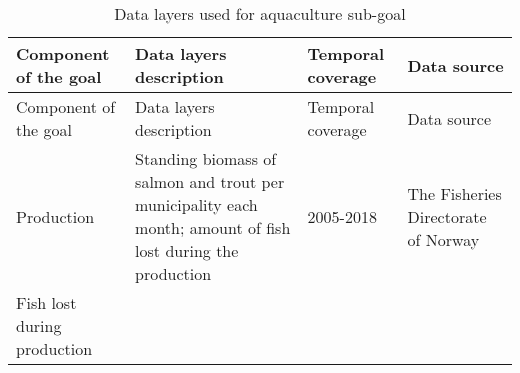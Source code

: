 \documentclass[
]{book}
\begin{document}
\begin{longtable}[]{@{}llll@{}}
\caption{\label{tab:simple-table} Data layers used for aquaculture sub-goal}\tabularnewline
\toprule
\begin{minipage}[b]{0.23\columnwidth}\raggedright
Component of the goal\strut
\end{minipage} & \begin{minipage}[b]{0.22\columnwidth}\raggedright
Data layers description\strut
\end{minipage} & \begin{minipage}[b]{0.25\columnwidth}\raggedright
Temporal coverage\strut
\end{minipage} & \begin{minipage}[b]{0.18\columnwidth}\raggedright
Data source\strut
\end{minipage}\tabularnewline
\midrule
\endfirsthead
\toprule
\begin{minipage}[b]{0.23\columnwidth}\raggedright
Component of the goal\strut
\end{minipage} & \begin{minipage}[b]{0.22\columnwidth}\raggedright
Data layers description\strut
\end{minipage} & \begin{minipage}[b]{0.25\columnwidth}\raggedright
Temporal coverage\strut
\end{minipage} & \begin{minipage}[b]{0.18\columnwidth}\raggedright
Data source\strut
\end{minipage}\tabularnewline
\midrule
\endhead
\begin{minipage}[t]{0.23\columnwidth}\raggedright
Production\strut
\end{minipage} & \begin{minipage}[t]{0.22\columnwidth}\raggedright
Standing biomass of salmon and trout per municipality each month; amount of fish lost during the production\strut
\end{minipage} & \begin{minipage}[t]{0.25\columnwidth}\raggedright
2005-2018\strut
\end{minipage} & \begin{minipage}[t]{0.18\columnwidth}\raggedright
The Fisheries Directorate of Norway\strut
\end{minipage}\tabularnewline
\begin{minipage}[t]{0.23\columnwidth}\raggedright
Fish lost during production\strut
\end{minipage} & \begin{minipage}[t]{0.22\columnwidth}\raggedright

\end{minipage}
\end{longtable}
\end{document}
